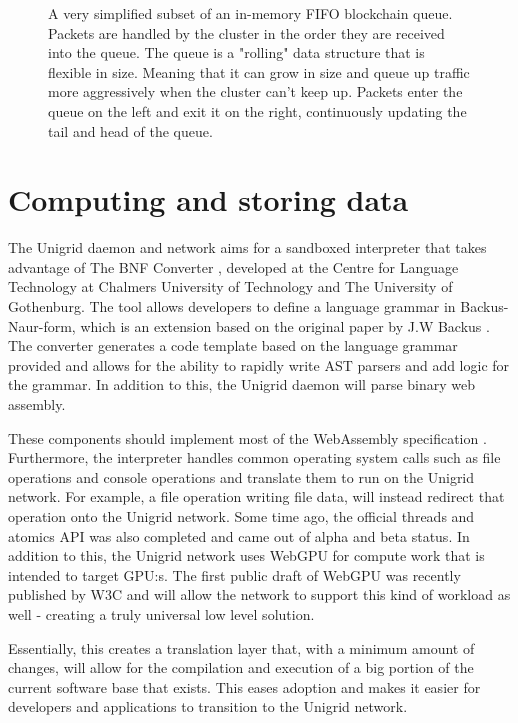 \documentclass[10pt,a4paper,final]{article}
\begin{document}
\begin{figure}[H]
\centering
{}
\caption{A very simplified subset of an in-memory FIFO blockchain queue. Packets are handled by the cluster in the order they are received into the queue. The queue is a "rolling" data structure that is flexible in size. Meaning that it can grow in size and queue up traffic more aggressively when the cluster can't keep up. Packets enter the queue on the left and exit it on the right, continuously updating the tail and head of the queue.}
\end{figure}

\section{Computing and storing data}
The Unigrid daemon and network aims for a sandboxed interpreter that takes advantage of The BNF Converter \cite{bnfc}, developed at the Centre for Language Technology at Chalmers University of Technology and The University of Gothenburg. The tool allows developers to define a language grammar in Backus-Naur-form, which is an extension based on the original paper by J.W Backus \cite{backus1959}. The converter generates a code template based on the language grammar provided and allows for the ability to rapidly write AST parsers and add logic for the grammar. In addition to this, the Unigrid daemon will parse binary web assembly.

These components should implement most of the WebAssembly specification \cite{webassembly}. Furthermore, the interpreter handles common operating system calls such as file operations and console operations and translate them to run on the Unigrid network. For example, a file operation writing file data, will instead redirect that operation onto the Unigrid network. Some time  ago, the official threads and atomics API \cite{webassemblythreads} was also completed and came out of alpha and beta status. In addition to this, the Unigrid network uses WebGPU for compute work that is intended to target GPU:s. The first public draft of WebGPU was recently published by W3C \cite{w3cwebgpu} and will allow the network to support this kind of workload as well - creating a truly universal low level solution.

Essentially, this creates a translation layer that, with a minimum amount of changes, will allow for the compilation and execution of a big portion of the current software base that exists. This eases adoption and makes it easier for developers and applications to transition to the Unigrid network.
\end{document}
